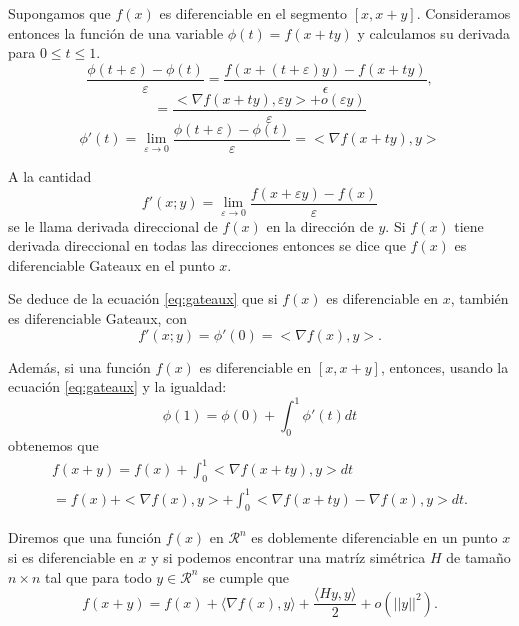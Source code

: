 Supongamos que $f(x)$ es diferenciable en el segmento $[x, x+y]$. Consideramos entonces la función de una variable $\phi(t) = f(x + ty)$ y calculamos su derivada para $0 \le t \le 1$.
\begin{equation}
    \frac{\phi(t+ \varepsilon) - \phi(t)}{\varepsilon} = \frac{f(x + (t + \varepsilon)y) - f(x+ty)}{\epsilon},
\end{equation}
\begin{equation}
    = \frac{<\nabla f(x + ty), \varepsilon y> + o(\varepsilon y)}{\varepsilon}
\end{equation}
\begin{equation}\label{eq:gateaux}
    \phi'(t) = \lim_{\varepsilon \to 0} \frac{\phi(t+ \varepsilon) - \phi(t)}{\varepsilon} = <\nabla f(x + t y), y>
\end{equation}

\begin{definition}
    A la cantidad
    $$ f'(x; y) = \lim_{\varepsilon \to 0} \frac{f(x + \varepsilon y) - f(x)}{\varepsilon}$$
    se le llama derivada direccional de $f(x)$ en la dirección de $y$. Si $f(x)$ tiene derivada direccional en todas las direcciones entonces se dice que $f(x)$ es diferenciable Gateaux en el punto $x$.
\end{definition}
    
    Se deduce de la ecuación \ref{eq:gateaux} que si $f(x)$ es diferenciable en $x$, también es diferenciable Gateaux, con
\begin{equation}\label{eq:gateauxEnX}
    f'(x;y)=\phi'(0)=<\nabla f(x), y>.
\end{equation}

Además, si una función $f(x)$ es diferenciable en $[x, x+y]$, entonces, usando la ecuación \ref{eq:gateaux} y la igualdad:
\begin{equation}
    \phi(1) = \phi(0) + \int_0^1 \phi'(t)dt
\end{equation}
obtenemos que
\begin{equation}\label{eq:integralderivative}
    \begin{split}
    f(x + y) = f(x) + \int_0^1 <\nabla f(x + ty), y>dt \\
    = f(x) + <\nabla f(x), y> + \int_0^1 <\nabla f(x + ty) - \nabla f(x), y>dt.
    \end{split}
\end{equation}

\begin{definition}
    Diremos que una función $f(x)$ en $\mathcal{R}^n$ es doblemente diferenciable en un punto $x$ si es diferenciable en $x$ y si podemos encontrar una matríz simétrica $H$ de tamaño $n \times n$ tal que para todo $y \in \mathcal{R}^n$ se cumple que 
    \begin{equation}
        f(x+y) = f(x) + \langle \nabla f(x), y \rangle + \frac{\langle Hy, y \rangle}{2} + o(||y||^2).
    \end{equation}
\end{definition}

